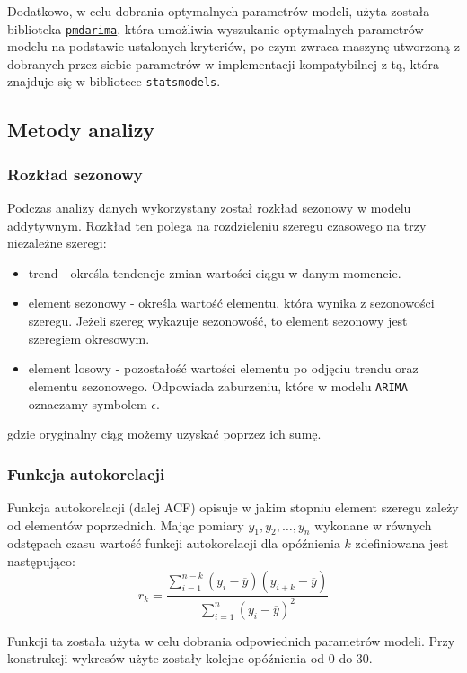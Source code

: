 \documentclass[12pt]{article}
\begin{document}
Dodatkowo, w celu dobrania optymalnych parametrów modeli, użyta została biblioteka \href{https://alkaline-ml.com/pmdarima/}{\texttt{pmdarima}}, która umożliwia wyszukanie optymalnych parametrów modelu na podstawie ustalonych kryteriów, po czym zwraca maszynę utworzoną z dobranych przez siebie parametrów w implementacji kompatybilnej z tą, która znajduje się w bibliotece \texttt{statsmodels}.

\subsection{Metody analizy}

\subsubsection{Rozkład sezonowy}

Podczas analizy danych wykorzystany został rozkład sezonowy w modelu addytywnym. Rozkład ten polega na rozdzieleniu szeregu czasowego na trzy niezależne szeregi:
\begin{itemize}
    \item trend - określa tendencje zmian wartości ciągu w danym momencie.
    \item element sezonowy - określa wartość elementu, która wynika z sezonowości szeregu. Jeżeli szereg wykazuje sezonowość, to element sezonowy jest szeregiem okresowym.
    \item element losowy - pozostałość wartości elementu po odjęciu trendu oraz elementu sezonowego. Odpowiada zaburzeniu, które w modelu \texttt{ARIMA} oznaczamy symbolem $\epsilon$.
\end{itemize}
gdzie oryginalny ciąg możemy uzyskać poprzez ich sumę.

\subsubsection{Funkcja autokorelacji}

Funkcja autokorelacji (dalej ACF) opisuje w jakim stopniu element szeregu zależy od elementów poprzednich. Mając pomiary $y_1, y_2, \dots, y_n$ wykonane w równych odstępach czasu wartość funkcji autokorelacji dla opóźnienia $k$ zdefiniowana jest następująco:
\[
    r_k = \frac{\sum^{n-k}_{i=1}(y_i - \overline{y})(y_{i+k} - \overline{y})}
    {\sum^{n}_{i=1}(y_i - \overline{y})^2}
\]

Funkcji ta została użyta w celu dobrania odpowiednich parametrów modeli. Przy konstrukcji wykresów użyte zostały kolejne opóźnienia od $0$ do $30$.
\end{document}
